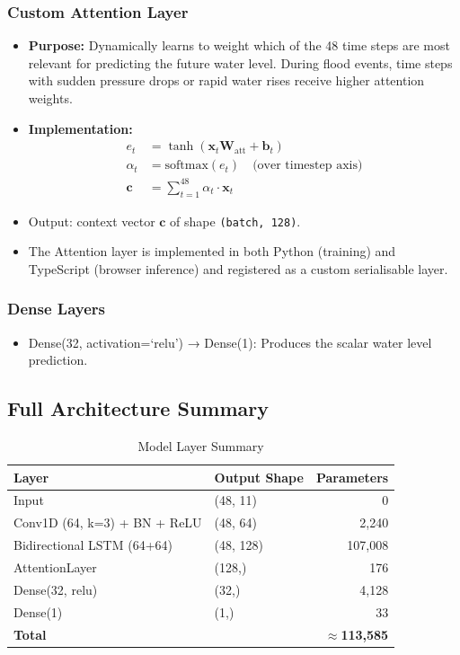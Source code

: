 \subsubsection{Custom Attention Layer}
\begin{itemize}[leftmargin=1.5em]
  \item \textbf{Purpose:} Dynamically learns to weight which of the 48 time steps are most relevant for predicting the future water level. During flood events, time steps with sudden pressure drops or rapid water rises receive higher attention weights.
  \item \textbf{Implementation:}
    \begin{align}
      e_t &= \tanh\!\left(\mathbf{x}_t \mathbf{W}_{\text{att}} + \mathbf{b}_t\right) \\
      \alpha_t &= \text{softmax}(e_t) \quad \text{(over timestep axis)} \\
      \mathbf{c} &= \sum_{t=1}^{48} \alpha_t \cdot \mathbf{x}_t
    \end{align}
  \item Output: context vector $\mathbf{c}$ of shape \texttt{(batch,\allowbreak{} 128)}.
  \item The Attention layer is implemented in both Python (training) and TypeScript (browser inference) and registered as a custom serialisable layer.
\end{itemize}

\subsubsection{Dense Layers}
\begin{itemize}[leftmargin=1.5em]
  \item Dense(32, activation=`relu') → Dense(1): Produces the scalar water level prediction.
\end{itemize}

\subsection{Full Architecture Summary}

\begin{table}[H]
\centering
\caption{Model Layer Summary}
\begin{tabular}{|l|l|r|}
\hline
\rowcolor{FloodLight}
\textbf{Layer} & \textbf{Output Shape} & \textbf{Parameters} \\
\hline
Input & (48, 11) & 0 \\
Conv1D (64, k=3) + BN + ReLU & (48, 64) & 2,240 \\
Bidirectional LSTM (64+64) & (48, 128) & 107,008 \\
AttentionLayer & (128,) & 176 \\
Dense(32, relu) & (32,) & 4,128 \\
Dense(1) & (1,) & 33 \\
\hline
\textbf{Total} & & \textbf{$\approx$113,585} \\
\hline
\end{tabular}
\end{table}


